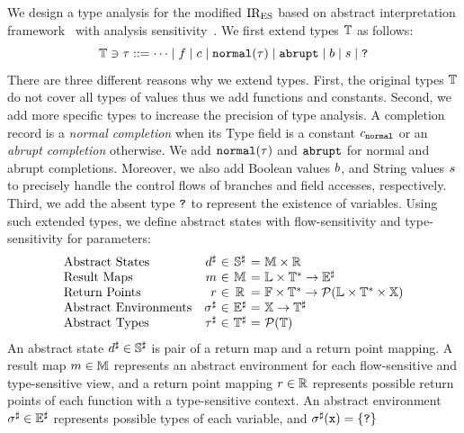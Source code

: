 We design a type analysis for the modified ${\text{IR}_\text{ES}}$ based on abstract
interpretation framework~\cite{ai1977, ai1992} with analysis
sensitivity~\cite{sens-toplas}.  We first extend types $\mathbb{T}$ as follows:
\[
  \mathbb{T} \ni \tau ::=
  \cdots \mid
  f \mid
  c \mid
  \texttt{normal}(\tau) \mid
  \texttt{abrupt} \mid
  b \mid
  s \mid
  \texttt{?}
\]
There are three different reasons why we extend types.  First, the original
types $\mathbb{T}$ do not cover all types of values thus we add functions and
constants.  Second, we add more specific types to increase the precision of type
analysis.  A completion record is a \textit{normal completion} when its Type
field is a constant $c_{\texttt{normal}}$ or an \textit{abrupt completion}
otherwise.  We add $\texttt{normal}(\tau)$ and $\texttt{abrupt}$ for normal and abrupt
completions.  Moreover, we also add Boolean values $b$, and String values
$s$ to precisely handle the control flows of branches and field accesses,
respectively.  Third, we add the absent type $\texttt{?}$ to represent the
existence of variables.  Using such extended types, we define abstract states
with flow-sensitivity and type-sensitivity for parameters:
\[
  \begin{array}{lr@{~}c@{~}c@{~}r@{~}l}
    \text{Abstract States}
    &\aelem&\in&\adom&=& \rmapset \times \retpset\\

    \text{Result Maps}
    &\rmap&\in&\rmapset&=& \labset \times \tyset^* \rightarrow \aenvset\\

    \text{Return Points}
    &\retp&\in&\retpset&=& \funcset \times \tyset^*
    \rightarrow \partsof{\labset \times \tyset^* \times \varset} \\

    \text{Abstract Environments}
    &\aenv&\in&\aenvset&=&\varset \rightarrow \atyset\\

    \text{Abstract Types}
    &\aty&\in&\atyset&=&\partsof{\tyset}\\
  \end{array}
\]
An abstract state ${d}^\sharp \in {\mathbb{S}}^\sharp$ is pair of a return map and a return point
mapping.  A result map $m \in \mathbb{M}$ represents an abstract environment
for each flow-sensitive and type-sensitive view, and a return point mapping
$r \in \mathbb{R}$ represents possible return points of each function with
a type-sensitive context.  An abstract environment ${\sigma}^\sharp \in {\mathbb{E}}^\sharp$
represents possible types of each variable, and ${\sigma}^\sharp(\texttt{x}) = \{ \texttt{?} \}$
